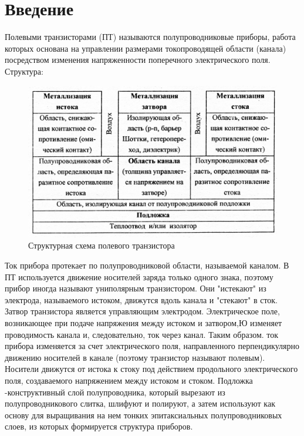 



\def\labauthors{Карусевич А.А., Шиков А.П.}
\def\labgroup{440}
\def\labnumber{2}
\def\labtheme{Измерение статистических характеристик полевого транзистора}
\renewcommand{\vec}{\mathbf}
\renewcommand{\phi}{\varphi}
\renewcommand{\hat}{\widehat}



\section{Введение}
Полевыми транзисторами (ПТ) называются полупроводниковые приборы, работа которых основана на управлении размерами токопроводящей области (канала) посредством изменения напряженности поперечного электрического поля. Структура:
\begin{figure}[h!]
	\centering
	\includegraphics[width=0.5\linewidth]{fig/fig1.jpg}
	\caption{Структурная схема полевого транзистора}
	\label{fig:1}
\end{figure}

Ток прибора протекает по полупроводниковой области, называемой каналом. В ПТ используется движение носителей заряда только одного знака, поэтому прибор иногда называют униполярным транзистором. Они "истекают" из электрода, называемого истоком, движутся вдоль канала и "стекают" в сток. Затвор транзистора является управляющим электродом. Электрическое поле, возникающее при подаче напряжения между истоком и затвором,Ю изменяет проводимость канала и, следовательно, ток через канал. Таким образом. ток прибора изменяется за счет электрического поля, направленного перпендикулярно движению носителей в канале (поэтому транзистор называют полевым). Носители движутся от истока к стоку под действием продольного электрического поля, создаваемого напряжением между истоком и стоком. Подложка -конструктивный слой полупроводника, который вырезают из полупроводникового слитка, шлифуют и полируют, а затем используют как основу для выращивания на нем тонких эпитаксиальных полупроводниковых слоев, из которых формируется структура приборов.

